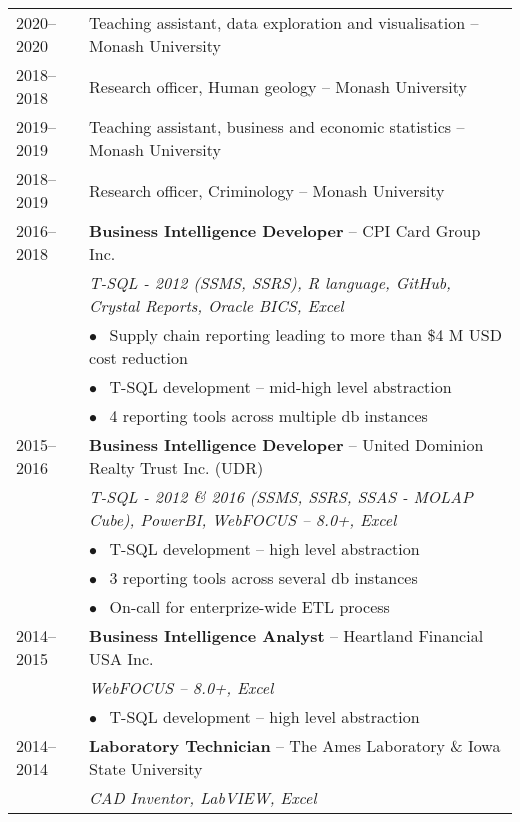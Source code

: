\documentclass[10pt,a4paper,]{article}
\begin{document}
\begin{tabular}{ll}
  2020--2020 & Teaching assistant, data exploration and visualisation -- Monash University \\ 
  2018--2018 & Research officer, Human geology -- Monash University \\ 
  2019--2019 & Teaching assistant, business and economic statistics -- Monash University \\ 
  2018--2019 & Research officer, Criminology -- Monash University \\ 
  2016--2018 & \textbf{Business Intelligence Developer} --  CPI Card Group Inc. \\ 
   & \textit{T-SQL - 2012 (SSMS, SSRS), R language, GitHub, Crystal Reports, Oracle BICS, Excel} \\ 
   & \hspace{5 mm} $\bullet~~$ Supply chain reporting leading to more than \$4 M USD cost reduction \\ 
   & \hspace{5 mm} $\bullet~~$ T-SQL development -- mid-high level abstraction \\ 
   & \hspace{5 mm} $\bullet~~$ 4 reporting tools across multiple db instances \\ 
  2015--2016 & \textbf{Business Intelligence Developer} -- United Dominion Realty Trust Inc. (UDR) \\ 
   & \textit{T-SQL - 2012 \& 2016 (SSMS, SSRS, SSAS - MOLAP Cube), PowerBI, WebFOCUS – 8.0+, Excel} \\ 
   & \hspace{5 mm} $\bullet~~$ T-SQL development -- high level abstraction \\ 
   & \hspace{5 mm} $\bullet~~$ 3 reporting tools across several db instances \\ 
   & \hspace{5 mm} $\bullet~~$ On-call for enterprize-wide ETL process \\ 
  2014--2015 & \textbf{Business Intelligence Analyst} -- Heartland Financial USA Inc. \\ 
   & \textit{WebFOCUS – 8.0+, Excel} \\ 
   & \hspace{5 mm} $\bullet~~$ T-SQL development -- high level abstraction \\ 
  2014--2014 & \textbf{Laboratory Technician} -- The Ames Laboratory \& Iowa State University \\ 
   & \textit{CAD Inventor, LabVIEW, Excel} \\ 

\end{tabular}
\end{document}
